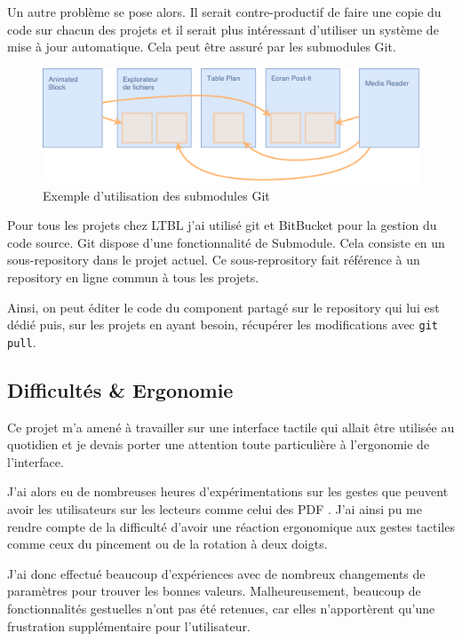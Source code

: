 Un autre problème se pose alors.
Il serait contre-productif de faire une copie du code sur chacun des projets et il serait plus intéressant d'utiliser un système de mise à jour automatique.
Cela peut être assuré par les submodules Git.

\begin{figure}[h]
    \centering
    \includegraphics[scale=0.5]{img/submodules.pdf}
    \caption{Exemple d'utilisation des submodules Git}
\end{figure}

Pour tous les projets chez LTBL j'ai utilisé git et BitBucket pour la gestion du code source.
Git dispose d'une fonctionnalité de Submodule.
Cela consiste en un sous-repository dans le projet actuel.
Ce sous-reprository fait référence à un repository en ligne commun à tous les projets.

Ainsi, on peut éditer le code du component partagé sur le repository qui lui est dédié puis, sur les projets en ayant besoin, récupérer les modifications avec \texttt{git pull}.

\subsection{Difficultés \& Ergonomie}

Ce projet m'a amené à travailler sur une interface tactile qui allait être utilisée au quotidien et je devais porter une attention toute particulière à l'ergonomie de l'interface.

J'ai alors eu de nombreuses heures d'expérimentations sur les gestes que peuvent avoir les utilisateurs sur les lecteurs comme celui des PDF .
J'ai ainsi pu me rendre compte de la difficulté d'avoir une réaction ergonomique aux gestes tactiles comme ceux du pincement ou de la rotation à deux doigts.

J'ai donc effectué beaucoup d'expériences avec de nombreux changements de paramètres pour trouver les bonnes valeurs.
Malheureusement, beaucoup de fonctionnalités gestuelles n'ont pas été retenues, car elles n'apportèrent qu'une frustration supplémentaire pour l'utilisateur.

